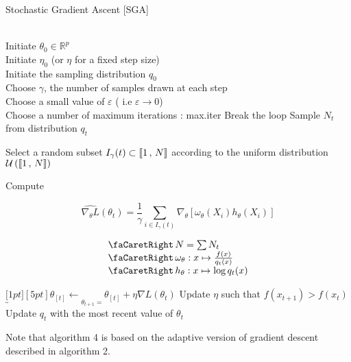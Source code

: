 	\begin{algorithm}[H]
		\caption{Stochastic Gradient Ascent [SGA]}\label{alg:sgaAdaptive}
		\begin{algorithmic}
			\Require
			\\ \ra Initiate $\theta_0 \in \mathbb R^p$
			\\ \ra Initiate $\eta_0$ (or $\eta$ for a fixed step size)
			\\ \ra Initiate the sampling distribution $q_0$
			\bigskip
			\\  Choose $\gamma$, the number of samples drawn at each step
			\bigskip
			\\ \ra Choose a small value of $\varepsilon$ ( i.e $\varepsilon \rightarrow 0 $)
			\\ \ra Choose a number of maximum iterations : max.iter
			\State Break the loop
			\EndIf
			\State Sample $N_t$ from distribution $q_t$

			\bigskip

			\State {} Select a random subset $I_\gamma(t) \subset \llbracket 1 \, , \, N \rrbracket$ according to the uniform distribution $\mathcal U \left( \llbracket 1 \, , \, N \rrbracket \right)$

			\bigskip

			\State {} Compute

			$$\widehat{\nabla_\theta L}(\theta_t) = \frac 1 \gamma \displaystyle\sum\limits_{i \in I_\gamma(t)} \nabla_\theta \left[\omega_\theta(X_i) h_\theta(X_i)\right]$$


			$$\begin{array}{l}
					\faCaretRight \, {N = \sum N_t}
					\\
					\faCaretRight \, {\omega_\theta : x \mapsto \frac{f(x)}{q_t(x)}}
					\\
					\faCaretRight \, {h_\theta : x \mapsto \log q_t(x)}
				\end{array}
			$$

			\smallskip

			\State \ra $\underbracket[1pt][5pt]{\theta_{[t]} \gets}_{\theta_{t+1} = } \theta_{[t]} + \eta \nabla L(\theta_t)$
			\State \ra Update $\eta$ such that $f(x_{t+1}) > f(x_t)$		 
                \State \ra Update $q_t$ with the most recent value of $\theta_t$
			\EndFor
		\end{algorithmic}
	\end{algorithm}

Note that algorithm 4 is based on the adaptive version of gradient descent described in algorithm 2.